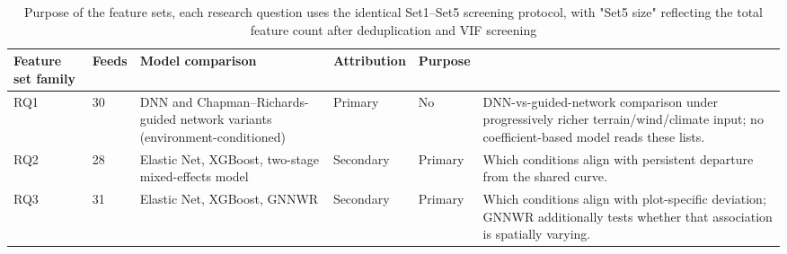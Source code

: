 \begin{table}[!htbp]
\centering
\scriptsize
\renewcommand{\arraystretch}{1.2}
\begin{tabular}{p{2.3cm}p{4.2cm}p{1.6cm}p{2cm}p{3.4cm}}
\toprule
Feature set family & Feeds & Model comparison & Attribution & Purpose \\
\midrule
RQ1 & 30 & DNN and Chapman--Richards-guided network variants (environment-conditioned) & Primary &
No & DNN-vs-guided-network comparison under progressively richer terrain/wind/climate input; no
coefficient-based model reads these lists. \\
RQ2 & 28 & Elastic Net, XGBoost, two-stage mixed-effects model & Secondary & Primary & Which
conditions align with persistent departure from the shared curve. \\
RQ3 & 31 & Elastic Net, XGBoost, GNNWR & Secondary & Primary & Which conditions align with
plot-specific deviation; GNNWR additionally tests whether that association is spatially
varying. \\
\bottomrule
\end{tabular}
\caption{Purpose of the feature sets, each research question uses the identical Set1--Set5 screening protocol, with "Set5 size" reflecting the total feature count after deduplication and VIF screening}
\label{tab:feature-set-purpose}
\end{table}

